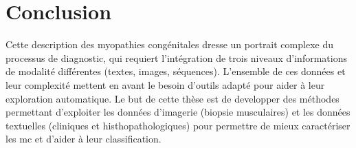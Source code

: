 \section{Conclusion}
Cette description des myopathies congénitales dresse un portrait complexe du processus de diagnostic, qui requiert l'intégration de trois niveaux d'informations de modalité différentes (textes, images, séquences). L'ensemble de ces données et leur complexité mettent en avant le besoin d'outils adapté pour aider à leur exploration automatique. Le but de cette thèse est de developper des méthodes permettant d'exploiter les données d'imagerie (biopsie musculaires) et les données textuelles (cliniques et histhopathologiques) pour permettre de mieux caractériser les \gls{mc} et d'aider à leur classification. 